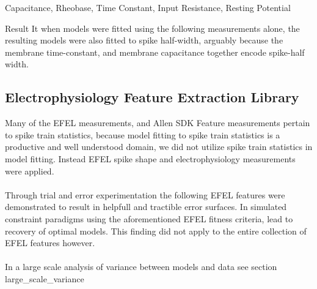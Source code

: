 Capacitance, Rheobase, Time Constant, Input Resistance, Resting Potential

Result It when models were fitted using the following measurements alone, the resulting models were also fitted to spike half-width, arguably because the membrane time-constant, and membrane capacitance together encode spike-half width.

\subsection{Electrophysiology Feature Extraction Library}

Many of the EFEL measurements, and Allen SDK Feature measurements pertain to spike train statistics, because model fitting to spike train statistics is a productive and well understood domain, we did not utilize spike train statistics in model fitting. Instead EFEL spike shape and electrophysiology measurements were applied.\\
\\
Through trial and error experimentation the following EFEL features were demonstrated to result in helpfull and tractible error surfaces. In simulated constraint paradigms using the aforementioned EFEL fitness criteria, lead to recovery of optimal models. This finding did not apply to the entire collection of EFEL features however.\\
\\
In a large scale analysis of variance between models and data see section large\_scale\_variance

